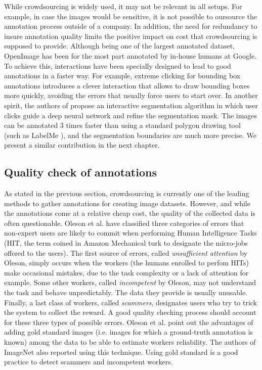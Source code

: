 While crowdsourcing is widely used, it may not be relevant in all setups. For example, in case the images would be sensitive, it is not possible to oursource the annotation process outside of a company. In addition, the need for redundancy to insure annotation quality limits the positive impact on cost that crowdsourcing is supposed to provide. Although being one of the largest annotated dataset, OpenImage has been for the most part annotated by in-house humans at Google. To achieve this, interactions have been specially designed to lead to good annotations in a faster way. For example, extreme clicking for bounding box annotations \cite{papadopoulos2017extreme} introduces a clever interaction that allows to draw bounding boxes more quickly, avoiding the errors that usually force users to start over. In another spirit, the authors of \cite{OpenImagesSegmentation} propose an interactive segmentation algorithm in which user clicks guide a deep neural network and refine the segmentation mask. The images can be annotated 3 times faster than using a standard polygon drawing tool (such as LabelMe \cite{russell2008labelme}), and the segmentation boundaries are much more precise. We present a similar contribution in the next chapter.


\subsection{Quality check of annotations}
\label{sec:annotation_quality}

As stated in the previous section, crowdsourcing is currently one of the leading methods to gather annotations for creating image datasets. However, and while the annotations come at a relative cheap cost, the quality of the collected data is often questionable. Oleson et al. \cite{oleson2011programmatic} have classified three categories of errors that non-expert users are likely to commit when performing Human Intelligence Tasks (HIT, the term coined in Amazon Mechanical turk to designate the micro-jobs offered to the users). The first source of errors, called \textit{unsufficient attention} by Oleson, simply occurs when the workers (the humans enrolled to perfom HITs) make occasional mistakes, due to the task complexity or a lack of attention for example. Some other workers, called \textit{incompetent} by Oleson, may not understand the task and behave unpredictably. The data they provide is usually unusable. Finally, a last class of workers, called \textit{scammers}, designates users who try to trick the system to collect the reward. A good quality checking process should account for these three types of possible errors. Oleson et al. point out the advantages of adding gold standard images (i.e. images for which a ground-truth annotation is known) among the data to be able to estimate workers reliability. The authors of ImageNet \cite{ILSVRC15} also reported using this technique. Using gold standard is a good practice to detect scammers and incompetent workers.


